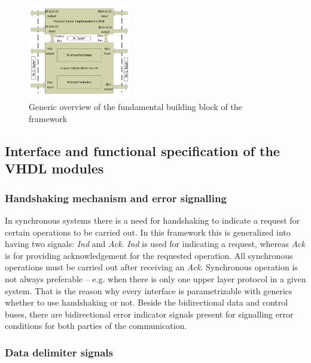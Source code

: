 \documentclass[journal]{IEEEtran}
\begin{document}
\begin{figure}[!htb]
    \centering
    \includegraphics[width=0.4\textwidth]{figures_raw/system_sketch.pdf}
    \caption{Generic overview of the fundamental building block of the framework}
    \label{fig:system_sketch}
\end{figure}

\subsection{Interface and functional specification of the VHDL modules}\label{subsec:if_and_func_spec_VHDL}

\subsubsection{Handshaking mechanism and error signalling}
In synchronous systems there is a need for handshaking to indicate a request for certain operations to be carried out.
In this framework this is generalized into having two signals: \emph{Ind} and \emph{Ack}.
\emph{Ind} is used for indicating a request, whereas \emph{Ack} is for providing acknowledgement for
the requested operation. All synchronous operations must be carried out after receiving an \emph{Ack}.
Synchronous operation is not always preferable -- e.g. when there is only one upper layer protocol in a
given system. That is the reason why every interface is parametrizable with generics whether to use
handshaking or not.
Beside the bidirectional data and control buses, there are bidirectional error indicator signals present
for signalling error conditions for both parties of the communication.

\subsubsection{Data delimiter signals}
\end{document}
